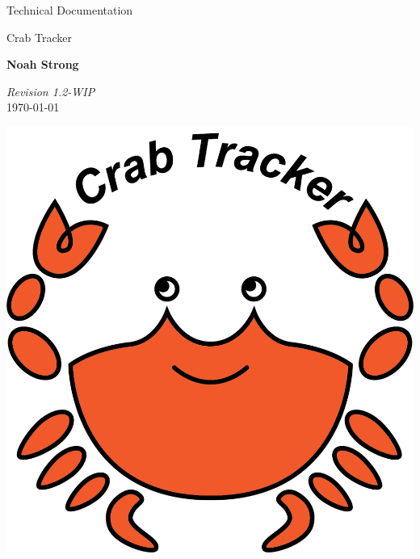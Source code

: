 \documentclass[12pt]{article}
\begin{document}
\begin{titlepage}

\vspace*{5cm}

\begin{huge}
Technical Documentation
\end{huge}

\begin{large}
Crab Tracker

\vspace*{1cm}

\textbf{Noah Strong}

\vspace*{1cm}
\end{large}

\textit{Revision 1.2-WIP}\\
\today

\vfill
\hfill \includegraphics[scale=1]{ct-logo.png}

\end{titlepage}
\tableofcontents{}

\newpage

\end{document}
